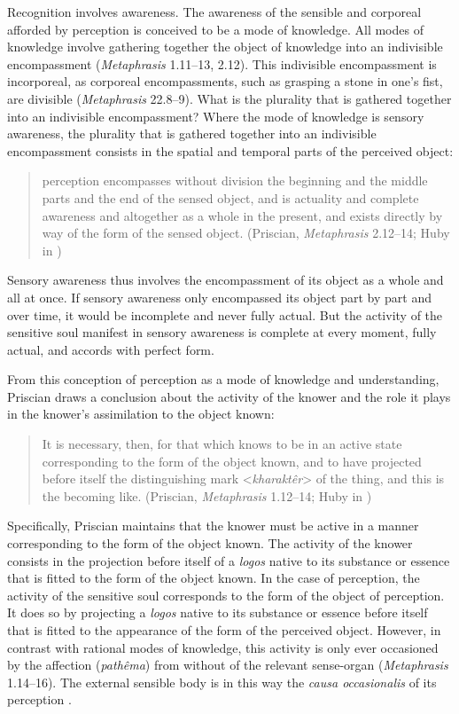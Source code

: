\documentclass[12pt]{article}
\begin{document}
Recognition involves awareness. The awareness of the sensible and corporeal afforded by perception is conceived to be a mode of knowledge. All modes of knowledge involve gathering together the object of knowledge into an indivisible encompassment (\emph{Metaphrasis} 1.11--13, 2.12). This indivisible encompassment is incorporeal, as corporeal encompassments, such as grasping a stone in one's fist, are divisible (\emph{Metaphrasis} 22.8--9). What is the plurality that is gathered together into an indivisible encompassment? Where the mode of knowledge is sensory awareness, the plurality that is gathered together into an indivisible encompassment consists in the spatial and temporal parts of the perceived object:
\begin{quote}
	perception encompasses without division the beginning and the middle parts and the end of the sensed object, and is actuality and complete awareness and altogether as a whole in the present, and exists directly by way of the form of the sensed object. (Priscian, \emph{Metaphrasis} 2.12--14; Huby in \citealt{Sorabji:1997ly})
\end{quote}
Sensory awareness thus involves the encompassment of its object as a whole and all at once. If sensory awareness only encompassed its object part by part and over time, it would be incomplete and never fully actual. But the activity of the sensitive soul manifest in sensory awareness is complete at every moment, fully actual, and accords with perfect form.

From this conception of perception as a mode of knowledge and understanding, Priscian draws a conclusion about the activity of the knower and the role it plays in the knower's assimilation to the object known: 
\begin{quote}
	It is necessary, then, for that which knows to be in an active state corresponding to the form of the object known, and to have projected before itself the distinguishing mark <\emph{kharaktêr}> of the thing, and this is the becoming like. (Priscian, \emph{Metaphrasis} 1.12--14; Huby in \citealt[9]{Sorabji:1997ly})
\end{quote}
Specifically, Priscian maintains that the knower must be active in a manner corresponding to the form of the object known. The activity of the knower consists in the projection before itself of a \emph{logos} native to its substance or essence that is fitted to the form of the object known. In the case of perception, the activity of the sensitive soul corresponds to the form of the object of perception. It does so by projecting a \emph{logos} native to its substance or essence before itself that is fitted to the appearance of the form of the perceived object. However, in contrast with rational modes of knowledge, this activity is only ever occasioned by the affection (\emph{pathêma}) from without of the relevant sense-organ (\emph{Metaphrasis} 1.14--16). The external sensible body is in this way the \emph{causa occasionalis} of its perception \citep[112]{Lautner:1994cs}.
\end{document}
